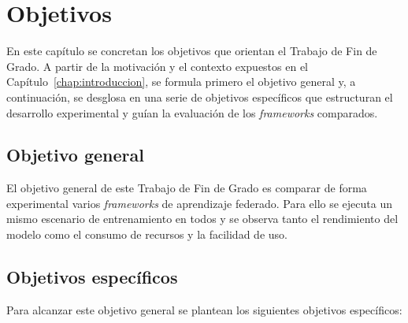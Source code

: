 \chapter{Objetivos}\label{chap:objetivos}

En este capítulo se concretan los objetivos que orientan el Trabajo de Fin de Grado. A
partir de la motivación y el contexto expuestos en el Capítulo~\ref{chap:introduccion},
se formula primero el objetivo general y, a continuación, se desglosa en una serie de
objetivos específicos que estructuran el desarrollo experimental y guían la evaluación
de los \textit{frameworks} comparados.

\section{Objetivo general}\label{sec:objetivo-general}

El objetivo general de este Trabajo de Fin de Grado es comparar de forma experimental
varios \textit{frameworks} de aprendizaje federado. Para ello se ejecuta un mismo
escenario de entrenamiento en todos y se observa tanto el rendimiento del modelo como el
consumo de recursos y la facilidad de uso.

\section{Objetivos específicos}\label{sec:objetivos-especificos}

Para alcanzar este objetivo general se plantean los siguientes objetivos específicos:

